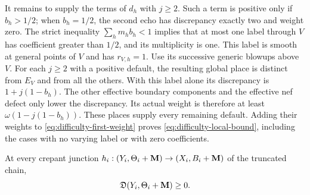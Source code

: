 It remains to supply the terms of \(d_h\) with \(j\geq2\).  Such a term
is positive only if \(b_h>1/2\); when \(b_h=1/2\), the second echo has
discrepancy exactly two and weight zero.  The strict inequality
\(\sum_hm_hb_h<1\) implies that at most one label through \(V\) has
coefficient greater than \(1/2\), and its multiplicity is one.  This label
is smooth at general points of \(V\) and has \(r_{V,h}=1\).  Use its
successive generic blowups above \(V\).  For each \(j\geq2\) with a
positive default, the resulting global place is distinct from \(E_V\) and
from all the others.  With this label alone its discrepancy is
\(1+j(1-b_h)\).  The other effective boundary components and the effective
nef defect only lower the discrepancy.  Its actual weight is therefore at
least \(\omega(1-j(1-b_h))\).  These places supply every remaining
default.  Adding their weights to \eqref{eq:difficulty-first-weight}
proves \eqref{eq:difficulty-local-bound}, including the cases with no
varying label or with zero coefficients.

\begin{proposition}
\label{prop:difficulty-lower}
At every crepant junction \(h_i:(Y_i,\Theta_i+\mathbf{M})\to(X_i,B_i+\mathbf{M})\) of
the truncated chain,
\[
 \mathfrak D(Y_i,\Theta_i+\mathbf{M})\geq0.
\]
\end{proposition}

